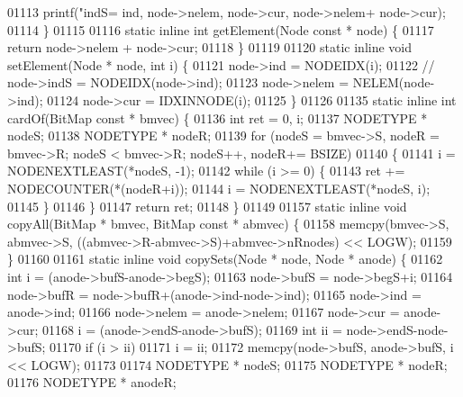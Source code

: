 \begin{DoxyCode}
01113         printf(\textcolor{stringliteral}{"indS=%
      ind, node->nelem, node->cur, node->nelem+ node->cur);
01114 \}
01115 
01116 \textcolor{keyword}{static} \textcolor{keyword}{inline} \textcolor{keywordtype}{int} getElement(Node \textcolor{keyword}{const} * node) \{
01117         \textcolor{keywordflow}{return} node->nelem + node->cur;
01118 \}
01119 
01120 \textcolor{keyword}{static} \textcolor{keyword}{inline} \textcolor{keywordtype}{void} setElement(Node * node, \textcolor{keywordtype}{int} i) \{
01121         node->ind = NODEIDX(i);
01122 \textcolor{comment}{//      node->indS = NODEIDX(node->ind);}
01123         node->nelem = NELEM(node->ind);
01124         node->cur = IDXINNODE(i);
01125 \}
01126 
01135 \textcolor{keyword}{static} \textcolor{keyword}{inline} \textcolor{keywordtype}{int} cardOf(BitMap \textcolor{keyword}{const} * bmvec) \{
01136         \textcolor{keywordtype}{int} ret = 0, i;
01137         NODETYPE * nodeS;
01138         NODETYPE * nodeR;
01139         \textcolor{keywordflow}{for} (nodeS = bmvec->S, nodeR = bmvec->R; nodeS < bmvec->R; nodeS++, nodeR+=
      BSIZE)
01140         \{
01141                 i = NODENEXTLEAST(*nodeS, -1);
01142                 \textcolor{keywordflow}{while} (i >= 0) \{
01143                         ret += NODECOUNTER(*(nodeR+i));
01144                         i = NODENEXTLEAST(*nodeS, i);
01145                 \}
01146         \}
01147         \textcolor{keywordflow}{return} ret;
01148 \}
01149 
01157 \textcolor{keyword}{static} \textcolor{keyword}{inline} \textcolor{keywordtype}{void} copyAll(BitMap * bmvec, BitMap \textcolor{keyword}{const} * abmvec) \{
01158         memcpy(bmvec->S, abmvec->S, ((abmvec->R-abmvec->S)+abmvec->nRnodes) << 
      LOGW);
01159 \}
01160 
01161 \textcolor{keyword}{static} \textcolor{keyword}{inline} \textcolor{keywordtype}{void} copySets(Node * node, Node * anode) \{
01162         \textcolor{keywordtype}{int} i = (anode->bufS-anode->begS);
01163         node->bufS = node->begS+i;
01164         node->bufR = node->bufR+(anode->ind-node->ind);
01165         node->ind = anode->ind;
01166         node->nelem = anode->nelem;
01167         node->cur = anode->cur;
01168         i = (anode->endS-anode->bufS);
01169         \textcolor{keywordtype}{int} ii = node->endS-node->bufS;
01170         \textcolor{keywordflow}{if} (i > ii)
01171                 i = ii;
01172         memcpy(node->bufS, anode->bufS, i << LOGW);
01173 
01174         NODETYPE * nodeS;
01175         NODETYPE * nodeR;
01176         NODETYPE * anodeR;
}
\end{DoxyCode}
